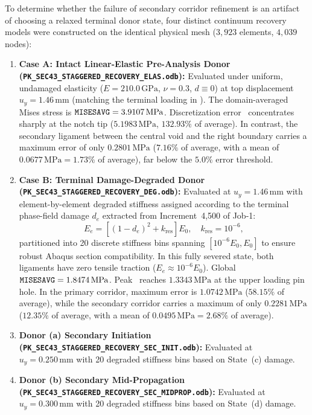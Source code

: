 To determine whether the failure of secondary corridor refinement is an artifact of choosing a relaxed terminal donor state, four distinct continuum recovery models were constructed on the identical physical mesh ($3{,}923$ elements, $4{,}039$ nodes):
\begin{enumerate}
  \item \textbf{Case A: Intact Linear-Elastic Pre-Analysis Donor (\texttt{PK\_SEC43\_STAGGERED\_RECOVERY\_ELAS.odb}):} Evaluated under uniform, undamaged elasticity ($E = 210.0\,\mathrm{GPa}$, $\nu = 0.3$, $d \equiv 0$) at top displacement $u_y = 1.46\,\mathrm{mm}$ (matching the terminal loading in \citet{pandey2025}). The domain-averaged Mises stress is $\texttt{MISESAVG} = 3.9107\,\mathrm{MPa}$. Discretization error \MISESERI\ concentrates sharply at the notch tip ($5.1983\,\mathrm{MPa}$, $132.93\%$ of average). In contrast, the secondary ligament between the central void and the right boundary carries a maximum error of only $0.2801\,\mathrm{MPa}$ ($7.16\%$ of average, with a mean of $0.0677\,\mathrm{MPa} = 1.73\%$ of average), far below the $5.0\%$ error threshold.
  \item \textbf{Case B: Terminal Damage-Degraded Donor (\texttt{PK\_SEC43\_STAGGERED\_RECOVERY\_DEG.odb}):} Evaluated at $u_y = 1.46\,\mathrm{mm}$ with element-by-element degraded stiffness assigned according to the terminal phase-field damage $d_e$ extracted from Increment~4,500 of Job-1:
  \begin{equation}
    E_e = \left[ (1 - d_e)^2 + k_{\mathrm{res}} \right] E_0, \quad k_{\mathrm{res}} = 10^{-6},
  \end{equation}
  partitioned into 20 discrete stiffness bins spanning $[10^{-6} E_0, E_0]$ to ensure robust Abaqus section compatibility. In this fully severed state, both ligaments have zero tensile traction ($E_e \approx 10^{-6} E_0$). Global $\texttt{MISESAVG} = 1.8474\,\mathrm{MPa}$. Peak \MISESERI\ reaches $1.3343\,\mathrm{MPa}$ at the upper loading pin hole. In the primary corridor, maximum error is $1.0742\,\mathrm{MPa}$ ($58.15\%$ of average), while the secondary corridor carries a maximum of only $0.2281\,\mathrm{MPa}$ ($12.35\%$ of average, with a mean of $0.0495\,\mathrm{MPa} = 2.68\%$ of average).
  \item \textbf{Donor (a) Secondary Initiation (\texttt{PK\_SEC43\_STAGGERED\_RECOVERY\_SEC\_INIT.odb}):} Evaluated at $u_y = 0.250\,\mathrm{mm}$ with 20 degraded stiffness bins based on State~(c) damage.
  \item \textbf{Donor (b) Secondary Mid-Propagation (\texttt{PK\_SEC43\_STAGGERED\_RECOVERY\_SEC\_MIDPROP.odb}):} Evaluated at $u_y = 0.300\,\mathrm{mm}$ with 20 degraded stiffness bins based on State~(d) damage.
\end{enumerate}

